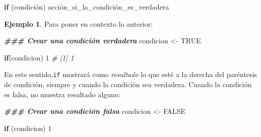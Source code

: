 \documentclass[
]{article}
\newenvironment{Shaded}{\begin{snugshade}}{\end{snugshade}}
\newcommand{\CommentTok}[1]{\textcolor[rgb]{0.56,0.35,0.01}{\textit{#1}}}
\newcommand{\ConstantTok}[1]{\textcolor[rgb]{0.00,0.00,0.00}{#1}}
\newcommand{\ControlFlowTok}[1]{\textcolor[rgb]{0.13,0.29,0.53}{\textbf{#1}}}
\newcommand{\DecValTok}[1]{\textcolor[rgb]{0.00,0.00,0.81}{#1}}
\newcommand{\DocumentationTok}[1]{\textcolor[rgb]{0.56,0.35,0.01}{\textbf{\textit{#1}}}}
\newcommand{\NormalTok}[1]{#1}
\newcommand{\OtherTok}[1]{\textcolor[rgb]{0.56,0.35,0.01}{#1}}
\theoremstyle{definition}
\theoremstyle{definition}
\newtheorem{example}{Ejemplo}[section]
\theoremstyle{definition}
\theoremstyle{definition}
\theoremstyle{remark}
\begin{document}
\begin{Shaded}
\begin{Highlighting}[]
\ControlFlowTok{if}\NormalTok{ (condición) acción\_si\_la\_condición\_es\_verdadera}
\end{Highlighting}
\end{Shaded}

\begin{example}

Para poner en contexto lo anterior:

\begin{Shaded}
\begin{Highlighting}[]
\DocumentationTok{\#\#\# Crear una condición verdadera}
\NormalTok{condicion }\OtherTok{\textless{}{-}} \ConstantTok{TRUE}

\ControlFlowTok{if}\NormalTok{(condicion) }\DecValTok{1}
\CommentTok{\# [1] 1}
\end{Highlighting}
\end{Shaded}

En este sentido,\texttt{if} mostrará como \emph{resultado} lo que esté a la derecha del paréntesis de condición, siempre y cuando la condición sea verdadera. Cuando la condición es falsa, no muestra resultado alguno:

\begin{Shaded}
\begin{Highlighting}[]
\DocumentationTok{\#\#\# Crear una condición falsa}
\NormalTok{condicion }\OtherTok{\textless{}{-}} \ConstantTok{FALSE}

\ControlFlowTok{if}\NormalTok{ (condicion) }\DecValTok{1}
\end{Highlighting}
\end{Shaded}

\end{example}
\end{document}
